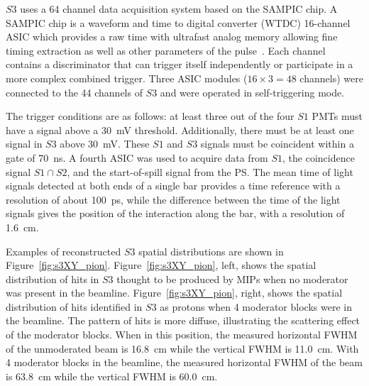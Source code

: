 $\mathit{S3}$ uses a 64 channel data acquisition system based on the SAMPIC chip.
A SAMPIC chip is a waveform and time to digital converter (WTDC) 16-channel ASIC which provides a raw time with ultrafast analog memory allowing fine timing extraction as well as other parameters of the pulse~\cite{SAMPIC}.
Each channel contains a discriminator that can trigger itself independently or participate in a more complex combined trigger. 
Three ASIC modules ($16\times3=48$ channels) were connected to the 44 channels of $\mathit{S3}$ and were operated in self-triggering mode.

The trigger conditions are as follows: at least three out of the four $\mathit{S1}$ PMTs must have a signal above a 30~mV threshold.
Additionally, there must be at least one signal in $\mathit{S3}$ above 30~mV.
These $\mathit{S1}$ and $\mathit{S3}$ signals must be coincident within a gate of 70~ns.
A fourth ASIC was used to acquire data from $\mathit{S1}$, the coincidence signal $\mathit{S1} \cap \mathit{S2}$, and the start-of-spill signal from the PS.
The mean time of light signals detected at both ends of a single bar provides a time reference with a resolution of about 100~ps, while the difference between the time of the light signals gives the position of the interaction along the bar, with a resolution of 1.6~cm.

Examples of reconstructed $\mathit{S3}$ spatial distributions are shown in Figure~\ref{fig:s3XY_pion}.
Figure~\ref{fig:s3XY_pion}, left, shows the spatial distribution of hits in $\mathit{S3}$ thought to be produced by MIPs when no moderator was present in the beamline.
Figure~\ref{fig:s3XY_pion}, right, shows the spatial distribution of hits identified in $\mathit{S3}$ as protons when 4 moderator blocks were in the beamline.
The pattern of hits is more diffuse, illustrating the scattering effect of the moderator blocks.
When in this position, the measured horizontal FWHM of the unmoderated beam is 16.8~cm while the vertical FWHM is 11.0~cm.
With 4 moderator blocks in the beamline, the measured horizontal FWHM of the beam is 63.8~cm while the vertical FWHM is 60.0~cm.

